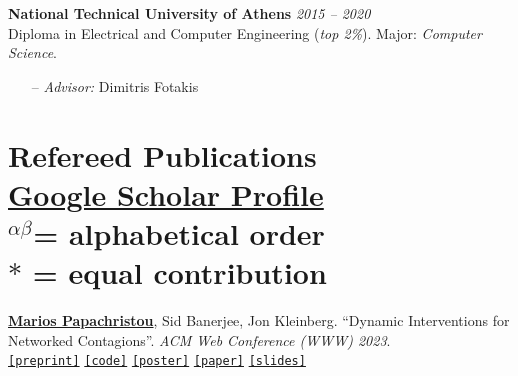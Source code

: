 \documentclass[margin]{res}
\newcommand{\field}[2]{\noindent \textbf{#1} \hfill #2 \\}
\newcommand{\alphabeticalorder}[0]{\ensuremath {^{\alpha \beta}}}
\newcommand{\specialurl}[2]{\href {#2} {\texttt{[#1]}}}
\newcommand{\preprint}[1]{\specialurl {preprint} {#1}}
\newcommand{\code}[1]{\specialurl {code} {#1}}
\newcommand{\slides}[1]{\specialurl {slides} {#1}}
\newcommand{\poster}[1]{\specialurl {poster} {#1}}
\newcommand{\paper}[1]{\specialurl {paper} {#1}}
\newcommand{\authorref}[1]{\underline {\textbf{#1}}}
\newcommand{\authorme}{\authorref{Marios Papachristou}}
\begin{document}
\begin{resume}
\field{National Technical University of Athens}  {\emph{2015 -- 2020}} 
Diploma in Electrical and Computer Engineering (\emph{top 2\%}). Major: \emph{Computer Science}.
\begin{itemize}[nosep]
\item[--] \emph{Advisor:} Dimitris Fotakis

\end{itemize} 

\section{Refereed Publications\\ {
\footnotesize
\textup{\href{https://scholar.google.gr/citations?user=T12JO3MAAAAJ&hl=en}{Google Scholar Profile}} \\\alphabeticalorder  = \textup{alphabetical order} \\ $*$ = \textup{equal contribution}
}}


\begin{enumerate}[nosep, label={[P\arabic*]}]    
 
   \item \authorme, Sid Banerjee, Jon Kleinberg. ``Dynamic Interventions for Networked Contagions''. \emph{ACM Web Conference (WWW) 2023}. \\
		\preprint{https://arxiv.org/abs/2205.13394} \code{https://github.com/papachristoumarios/dynamic-clearing} \poster{https://drive.google.com/file/d/1l0TCsoZNo3NoOOHsPSh1ofctXD4ivFir/view?usp=sharing}
		\paper{https://dl.acm.org/doi/abs/10.1145/3543507.3583470}
		\slides{https://drive.google.com/file/d/1ZZ6F6PFNsBjYKFyurkwM2IbenuzXJEAs/view?usp=share_link}



\end{enumerate}
\end{resume}
\end{document}
